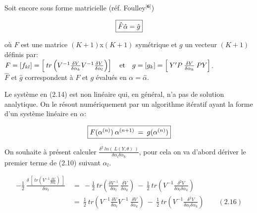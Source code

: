 \documentclass[11pt,fleqn]{book} %
\begin{document}
\vspace{1em}

Soit encore sous forme matricielle (réf. Foulley$^\textbf{[6]}$)

\begin{equation}
\fbox{$
\hat{F}\hat{\alpha}=\hat{g}
$}
\end{equation}

\vspace{0.5em}

où $F$ est une matrice $(K+1)$x$(K+1)$ symétrique et $g$ un vecteur $(K+1)$ définis par:\\ 
$F=[f_{kl}]=\left[\:tr\left(V^{-1} \frac{ \delta V }{\delta \alpha_k}  V^{-1} \frac{ \delta V} {\delta \alpha_l}\right) \right] \quad\textnormal{et}\quad g=[g_k]=\left[\:Y'P\:\frac{ \delta V }{\delta \alpha_k}\: P Y\right]$.\\
$\hat{F}$ et $\hat{g}$ correspondent à $F$ et $g$ évalués en $\alpha=\hat{\alpha}$.

\vspace{2em}

Le système en (2.14) est non linéaire qui, en général, n'a pas de solution analytique. On le résout numériquement par un algorithme itératif ayant la forme d'un système linéaire en $\alpha$:

\begin{equation}
\fbox{$
F(\alpha^{(n)})\:\alpha^{(n+1)}\:=\:g(\alpha^{(n)})
$}
\end{equation}


\newpage



On souhaite à présent calculer $\frac{\delta^2 \: ln( \:\textit{L}(Y,\theta)\:) }{\delta \alpha_l \delta \alpha_k} $, pour cela on va d'abord dériver le premier terme de (2.10) suivant $\alpha_l$.

\begin{align*}
 - \frac{1}{2}  \: \frac{ \delta \: \left[ \: tr\left( V^{-1} \frac{ \delta V }{\delta \alpha_k} \right) \: \right] }{\delta \alpha_l } \: &= \:  -\frac{1}{2} \: tr\left( \frac{\delta V^{-1}}{\delta \alpha_l}\:  \frac{ \delta V }{\delta \alpha_k} \right)  \:-\: \frac{1}{2} \: tr\left( V^{-1} \frac{ \delta^2 V }{\delta \alpha_l \delta \alpha_k} \right)\\
 	&= \:  \frac{1}{2} \: tr\left( V^{-1} \frac{ \delta V }{\delta \alpha_l} V^{-1}\:  \frac{ \delta V }{\delta \alpha_k} \right)  \:-\: \frac{1}{2} \: tr\left( V^{-1} \frac{ \delta^2 V }{\delta \alpha_l \delta \alpha_k} \right) \quad\quad (2.16)
\end{align*}
\end{document}
